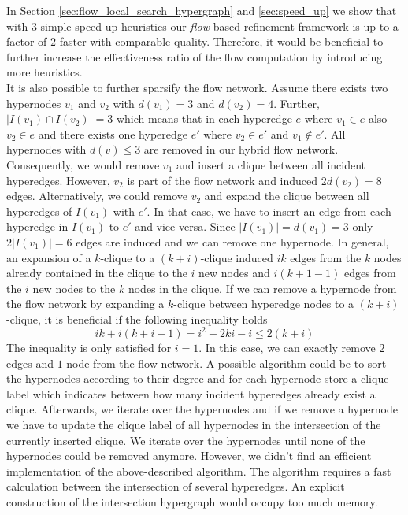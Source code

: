 In Section \ref{sec:flow_local_search_hypergraph} and \ref{sec:speed_up} we show that with
$3$ simple speed up heuristics our \emph{flow}-based refinement framework is up to a factor
of $2$ faster with comparable quality. Therefore, it would be beneficial to further increase
the effectiveness ratio of the flow computation by introducing more heuristics. \\
It is also possible to further sparsify the flow network. Assume there exists two hypernodes
$v_1$ and $v_2$ with $d(v_1) = 3$ and $d(v_2) = 4$. Further, $|I(v_1) \cap I(v_2)| = 3$ which means
that in each hyperedge $e$ where $v_1 \in e$ also $v_2 \in e$ and there exists one hyperedge $e'$
where $v_2 \in e'$ and $v_1 \notin e'$. All hypernodes with $d(v) \le 3$ are removed in our
hybrid flow network. Consequently, we would remove $v_1$ and insert a clique between all incident
hyperedges. However, $v_2$ is part of the flow network and induced $2d(v_2) = 8$ edges.
Alternatively, we could remove $v_2$ and expand the clique between all hyperedges of $I(v_1)$
with $e'$. In that case, we have to insert an edge from each hyperedge in $I(v_1)$ to $e'$ and vice
versa. Since $|I(v_1)| = d(v_1) = 3$ only $2|I(v_1)| = 6$ edges are induced and we can remove
one hypernode. In general, an expansion of a $k$-clique to a $(k+i)$-clique induced 
$ik$ edges from the $k$ nodes already contained in the clique to the $i$ new nodes and
$i(k+1-1)$ edges from the $i$ new nodes to the $k$ nodes in the clique. If we can remove a 
hypernode from the flow network by expanding a $k$-clique between hyperedge nodes to a $(k+i)$-clique,
it is beneficial if the following inequality holds 
\[ik + i(k+i-1) = i^2 + 2ki - i \le 2(k+i)\]
The inequality is only satisfied for $i = 1$. In this case, we can exactly remove $2$ edges and
$1$ node from the flow network. A possible algorithm could be to sort the hypernodes according
to their degree and for each hypernode store a clique label which indicates between how many
incident hyperedges already exist a clique. Afterwards, we iterate over the hypernodes and if we remove
a hypernode we have to update the clique label of all hypernodes in the intersection of the
currently inserted clique. We iterate over the hypernodes until none of the hypernodes could
be removed anymore. However, we didn't find an efficient implementation of the above-described
algorithm. The algorithm requires a fast calculation between the intersection of several
hyperedges. An explicit construction of the intersection hypergraph would occupy too much
memory. 
